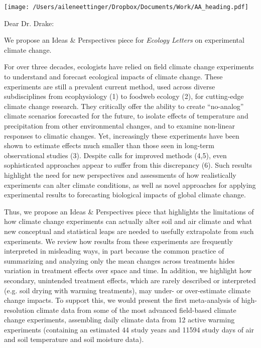 \documentclass[11pt,a4paper]{letter}
\begin{document}


\begin{letter}{}
\texttt{[image: /Users/aileneettinger/Dropbox/Documents/Work/AA\_heading.pdf]}

\opening{Dear Dr. Drake:}
We propose an Ideas \& Perspectives piece for \emph{Ecology Letters} on experimental climate change. 

For over three decades, ecologists have relied on field climate change experiments to understand and forecast ecological impacts of climate change. These experiments are still a prevalent current method, used across diverse subdisciplines from ecophysiology (1) %
to foodweb ecology (2), %
for cutting-edge climate change research. They critically offer the ability to create ``no-analog'' climate scenarios forecasted for the future, to isolate effects of temperature and precipitation from other environmental changes, and to examine non-linear responses to climatic changes. Yet, increasingly these experiments have been shown to estimate effects much smaller than those seen in long-term observational studies (3). %
Despite calls for improved methods (4,5), %
even sophisticated approaches appear to suffer from this discrepancy (6). %
Such results highlight the need for new perspectives and assessments of how realistically experiments can alter climate conditions, as well as novel approaches for applying experimental results to forecasting biological impacts of global climate change. 

Thus, we propose an Ideas \& Perspectives piece that highlights the limitations of how climate change experiments can actually alter soil and air climate and what new conceptual and statistical leaps are needed to usefully extrapolate from such experiments. We review how results from these experiments are frequently interpreted in misleading ways, in part because the common practice of summarizing and analyzing only the mean changes across treatments hides variation in treatment effects over space and time. In addition, we highlight how secondary, unintended treatment effects, which are rarely described or interpreted (e.g. soil drying with warming treatments), may under- or over-estimate climate change impacts. To support this, we would present the first meta-analysis of high-resolution climate data from some of the most advanced field-based climate change experiments, assembling daily climate data from 12 active warming experiments (containing an estimated 44 study years and 11594 study days of air and soil temperature and soil moisture data). %



\end{letter}
\end{document}
